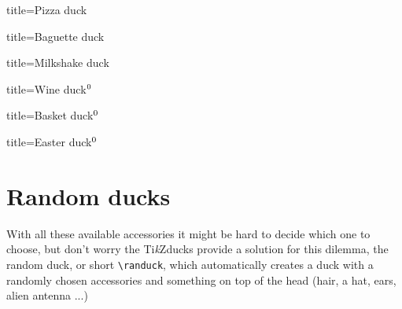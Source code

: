 \documentclass[parskip=half]{scrartcl}
\newcommand{\tikzducks}{Ti\emph{k}Zducks\xspace}
\begin{document}
\begin{tcblisting}{title={Pizza duck}}
\begin{tikzpicture}
  \duck[pizza]
\end{tikzpicture}	
\end{tcblisting}

\begin{tcblisting}{title={Baguette duck}}
\begin{tikzpicture}
  \duck[baguette=brown]
\end{tikzpicture}	
\end{tcblisting}

\begin{tcblisting}{title={Milkshake duck}}
\begin{tikzpicture}
	\duck[milkshake=red!20!white]
\end{tikzpicture}	
\end{tcblisting}

\addtocounter{footnote}{1}
\begin{tcblisting}{title={Wine duck$^{\thefootnote}$}}
\begin{tikzpicture}
	\duck[wine=red!70!black]
\end{tikzpicture}
\end{tcblisting}

\addtocounter{footnote}{1}
\begin{tcblisting}{title={Basket duck$^{\thefootnote}$}}
\begin{tikzpicture}
	\duck[basket=brown]
\end{tikzpicture}
\end{tcblisting}

\begin{tcblisting}{title={Easter duck$^{\thefootnote}$}}
\begin{tikzpicture}
	\duck[bunny,easter=brown,egga=cyan,eggb=orange,eggc=teal]
\end{tikzpicture}
\end{tcblisting}

\clearpage
\section{Random ducks}
With all these available accessories it might be hard to decide which one to choose, but don't worry the \tikzducks provide a solution for this dilemma, the random duck, or short \lstinline|\randuck|, which automatically creates a duck with a randomly chosen accessories and something on top of the head (hair, a hat, ears, alien antenna ...)
\end{document}
